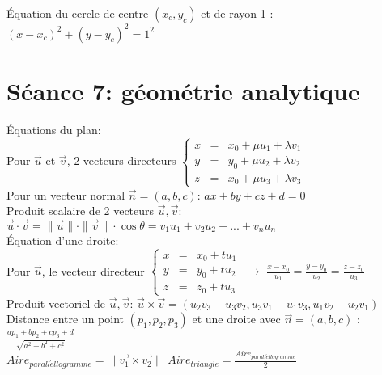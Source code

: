\documentclass[12pt]{article}
\begin{document}
\'Equation du cercle de centre $(x_{c}, y_{c})$ et de rayon 1 : $(x-x_{c})^{2}+(y-y_{c})^{2} = 1^{2}$

\section*{S\'eance 7: g\'eom\'etrie analytique}

\'Equations du plan: \\
\indent \indent Pour $\vec{u}$ et $\vec{v}$, 2 vecteurs directeurs
\(\left \lbrace
   \begin{array}{rcl}
      x & = & x_0+\mu u_1+\lambda v_1 \\
      y & = & y_0+ \mu u_2+\lambda v_2 \\
      z & = & x_0+ \mu u_3+\lambda v_3
   \end{array}
\right. \) \\ \newline
\indent \indent Pour un vecteur normal $\vec{n} = (a, b, c)$: $ax+by+cz+d=0$ \\ \newline
\indent Produit scalaire de 2 vecteurs $\vec{u}, \vec{v}$:
$\vec{u}\cdot\vec{v} = \|\vec{u}\| \cdot \|\vec{v}\| \cdot \cos{\theta} = v_{1}u_{1} + v_{2}u_{2}+ ... + v_{n}u_{n}$ \\ \newline
\indent \'Equation d'une droite: \\
\indent \indent Pour $\vec{u}$, le vecteur directeur
\(\left \lbrace
	\begin{array}{rcl}
		x & = & x_0+tu_1 \\
		y & = & y_0+tu_2 \\
		z & = & z_0+tu_3
	\end{array} \right. \) $\rightarrow$ $\frac{x-x_0}{u_1} = \frac{y-y_0}{u_2} = \frac{z-z_0}{u_3}$ \\

\indent Produit vectoriel de $\vec{u}, \vec{v}$: $\vec{u} \times \vec{v} = (u_2v_3 - u_3v_2, u_3v_1 - u_1v_3, u_1v_2 - u_2v_1)$ \\

\indent Distance entre un point $(p_1, p_2, p_3)$ et une droite avec $\vec{n} = (a, b, c)$ : $\frac{ap_1+bp_2+cp_3+d}{\sqrt{a^2+b^2+c^2}}$ \\ \newline
\indent $Aire_{parall\acute ellogramme} = \|\vec{v_{1}} \times \vec{v_{2}} \|$
\indent $Aire_{triangle} = \frac{Aire_{parall\acute ellogramme}}{2}$
\end{document}
